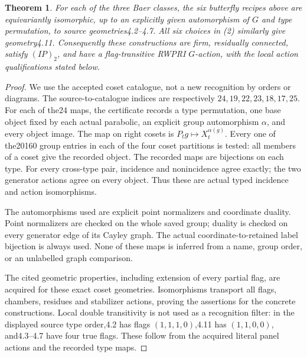 \documentclass[11pt]{article}
\newtheorem{theorem}{Theorem}\newtheorem{lemma}[theorem]{Lemma}
\begin{document}
\begin{theorem}
For each of the three Baer classes, the six butterfly recipes above are
equivariantly isomorphic, up to an explicitly given automorphism of $G$
and type permutation, to source geometries4.2--4.7. All six choices in (2)
similarly give geometry4.11. Consequently these constructions are firm,
residually connected, satisfy $(IP)_2$, and have a flag-transitive RWPRI
$G$-action, with the local action qualifications stated below.
\end{theorem}
\begin{proof}
We use the accepted coset catalogue, not a new recognition by orders or
diagrams. The source-to-catalogue indices are respectively
$24,19,22,23,18,17,25$. For each of the24 maps, the certificate records
a type permutation, one base object fixed by each actual parabolic, an
explicit group automorphism $\alpha$, and every object image. The map on
right cosets is
$P_tg\mapsto X_t^{\alpha(g)}$.
Every one of the20160 group entries in each of the four coset partitions
is tested: all members of a coset give the recorded object. The recorded
maps are bijections on each type. For every cross-type pair, incidence
and nonincidence agree exactly; the two generator actions agree on every
object. Thus these are actual typed incidence and action isomorphisms.

The automorphisms used are explicit point normalizers and coordinate duality.
Point normalizers are checked on the whole saved group; duality is checked
on every generator edge of its Cayley graph. The actual coordinate-to-retained
label bijection is always used. None of these maps is inferred from a name,
group order, or an unlabelled graph comparison.

The cited geometric properties, including extension of every partial flag,
are acquired for these exact coset geometries. Isomorphisms transport all
flags, chambers, residues and stabilizer actions, proving the assertions
for the concrete constructions. Local double transitivity is not used as
a recognition filter: in the displayed source type order,4.2 has flags
$(1,1,1,0)$,4.11 has $(1,1,0,0)$, and4.3--4.7 have four true flags.
These follow from the acquired literal panel actions and the recorded type maps.
\end{proof}
\end{document}
